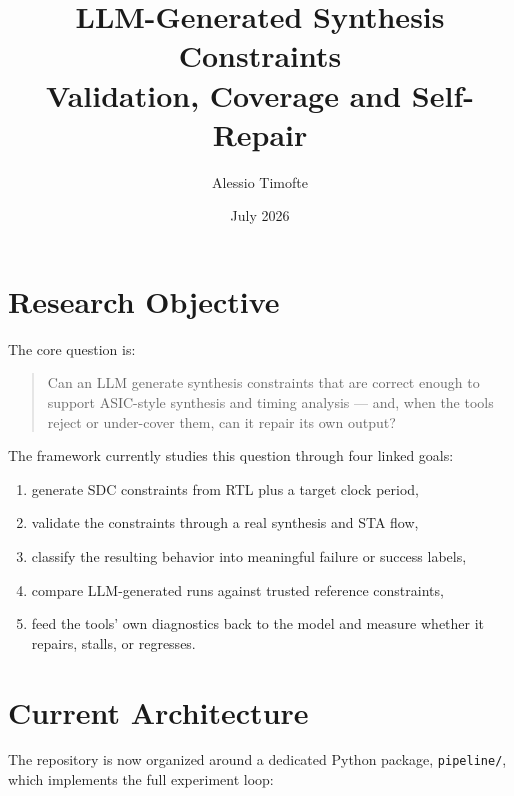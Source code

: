 \documentclass[11pt]{article}
\title{LLM-Generated Synthesis Constraints\\Validation, Coverage and Self-Repair}
\author{Alessio Timofte}
\date{July 2026}
\begin{document}
\maketitle

\section*{Research Objective}
The core question is:
\begin{quote}
Can an LLM generate synthesis constraints that are correct enough to support ASIC-style synthesis and timing analysis --- and, when the tools reject or under-cover them, can it repair its own output?
\end{quote}

The framework currently studies this question through four linked goals:
\begin{enumerate}[leftmargin=*,nosep]
    \item generate SDC constraints from RTL plus a target clock period,
    \item validate the constraints through a real synthesis and STA flow,
    \item classify the resulting behavior into meaningful failure or success labels,
    \item compare LLM-generated runs against trusted reference constraints,
    \item feed the tools' own diagnostics back to the model and measure whether it repairs, stalls, or regresses.
\end{enumerate}

\section*{Current Architecture}
The repository is now organized around a dedicated Python package, \texttt{pipeline/}, which implements the full experiment loop:
\end{document}
